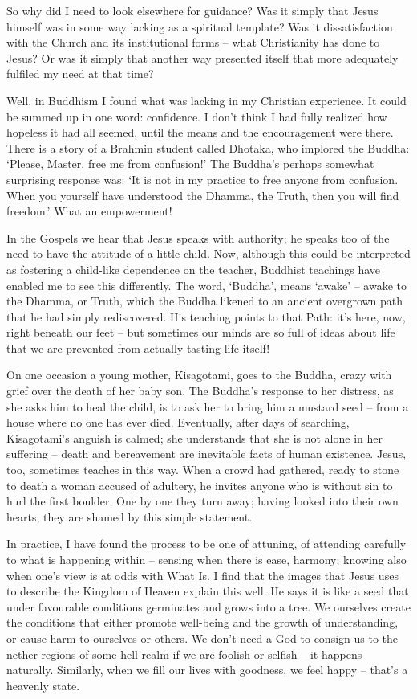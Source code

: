 So why did I need to look elsewhere for guidance? Was it simply that Jesus himself was in some way lacking as a spiritual template? Was it dissatisfaction with the Church and its institutional forms -- what Christianity has done to Jesus?  Or was it simply that another way presented itself that more adequately fulfiled my need at that time? 

Well, in Buddhism I found what was lacking in my Christian experience. It could be summed up in one word: confidence. I don't think I had fully realized how hopeless it had all seemed, until the means and the encouragement were there. There is a story of a Brahmin student called Dhotaka, who implored the Buddha: `Please, Master, free me from confusion!' The Buddha's perhaps somewhat surprising response was: `It is not in my practice to free anyone from confusion. When you yourself have understood the Dhamma, the Truth, then you will find freedom.' What an empowerment! 

In the Gospels we hear that Jesus speaks with authority; he speaks too of the need to have the attitude of a little child. Now, although this could be interpreted as fostering a child-like dependence on the teacher, Buddhist teachings have enabled me to see this differently. The word, `Buddha', means `awake' -- awake to the Dhamma, or Truth, which the Buddha likened to an ancient overgrown path that he had simply rediscovered. His teaching points to that Path: it's here, now, right beneath our feet -- but sometimes our minds are so full of ideas about life that we are prevented from actually tasting life itself!

On one occasion a young mother, Kisagotami, goes to the Buddha, crazy with grief over the death of her baby son. The Buddha's response to her distress, as she asks him to heal the child, is to ask her to bring him a mustard seed -- from a house where no one has ever died. Eventually, after days of searching, Kisagotami's anguish is calmed; she understands that she is not alone in her suffering -- death and bereavement are inevitable facts of human existence. Jesus, too, sometimes teaches in this way. When a crowd had gathered, ready to stone to death a woman accused of adultery, he invites anyone who is without sin to hurl the first boulder. One by one they turn away; having looked into their own hearts, they are shamed by this simple statement.

In practice, I have found the process to be one of attuning, of attending carefully to what is happening within -- sensing when there is ease, harmony; knowing also when one's view is at odds with What Is. I find that the images that Jesus uses to describe the Kingdom of Heaven explain this well. He says it is like a seed that under favourable conditions germinates and grows into a tree. We ourselves create the conditions that either promote well-being and the growth of understanding, or cause harm to ourselves or others. We don't need a God to consign us to the nether regions of some hell realm if we are foolish or selfish -- it happens naturally. Similarly, when we fill our lives with goodness, we feel happy -- that's a heavenly state.

